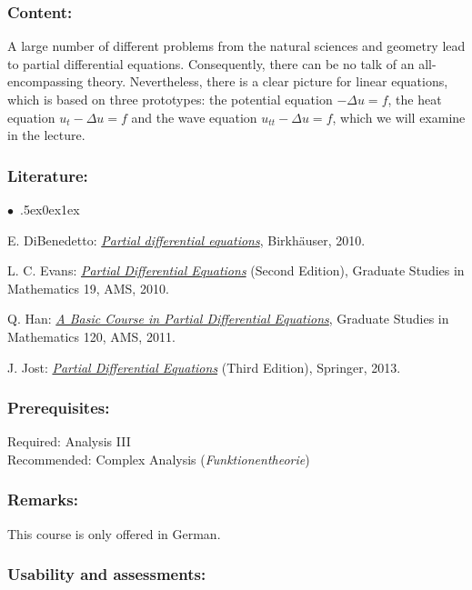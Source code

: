\documentclass[a4paper,10pt]{article}
\renewenvironment{itemize}{\begin{list}{$\bullet$\ }{\itemsep.5ex\setlength{\topsep}{0.5\itemsep}\parsep0ex\labelsep1ex\settowidth{\labelwidth}{$\bullet$\ }\setlength{\leftmargin}{\labelwidth}\addtolength{\leftmargin}{3ex}\addtolength{\leftmargin}{\labelsep}}}{\end{list}}
\begin{document}
\subsubsection*{\large
    Content:
}
A large number of different problems from the natural sciences and geometry lead to partial differential equations. Consequently, there can be no talk of an all-encompassing theory. Nevertheless, there is a clear picture for linear equations, which is based on three prototypes: the potential equation $-\Delta u = f$, the heat equation $u_t - \Delta u = f$ and the wave equation $u_{tt} - \Delta u = f$, which we will examine in the lecture.
\subsubsection*{\large
    Literature:
}
\begin{itemize}
\item
E. DiBenedetto: \href{https://link.springer.com/book/10.1007/978-0-8176-4552-6}{\emph{Partial differential equations}}, Birkhäuser, 2010. 
\item
L. C. Evans: \href{http://home.ustc.edu.cn/\~xushijie/pdf/textbooks/pde-evans.pdf}{\emph{Partial Differential Equations}} (Second Edition), Graduate Studies in Mathematics 19, AMS, 2010.
\item
Q. Han: \href{https://pdfcoffee.com/a-basic-course-in-partial-differential-equations-qing-han-pdf-free.html}{\emph{A Basic Course in Partial Differential Equations}}, Graduate Studies in Mathematics 120, AMS, 2011. 
\item
J. Jost: \href{http://www.redi-bw.de/start/unifr/EBooks-springer/10.1007/978-1-4614-4809-9}{\emph{Partial Differential Equations}} (Third Edition), Springer, 2013. 
\end{itemize}
\subsubsection*{\large
    Prerequisites:
}
Required: Analysis III \\
Recommended: Complex Analysis ({\em Funktionentheorie})
\subsubsection*{\large
    Remarks:
}
This course is only offered in German.
\subsubsection*{\large
    Usability and assessments:
}
\end{document}
